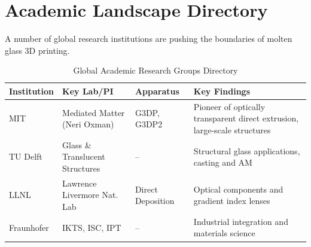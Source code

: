 \section{Academic Landscape Directory}
A number of global research institutions are pushing the boundaries of molten glass 3D printing.

\begin{table}[h]
\centering
\caption{Global Academic Research Groups Directory}
\begin{tabularx}{\textwidth}{l l l X}
\toprule
\textbf{Institution} & \textbf{Key Lab/PI} & \textbf{Apparatus} & \textbf{Key Findings} \\
\midrule
MIT & Mediated Matter (Neri Oxman) & G3DP, G3DP2 & Pioneer of optically transparent direct extrusion, large-scale structures \\
TU Delft & Glass \& Translucent Structures & -- & Structural glass applications, casting and AM \\
LLNL & Lawrence Livermore Nat. Lab & Direct Deposition & Optical components and gradient index lenses \\
Fraunhofer & IKTS, ISC, IPT & -- & Industrial integration and materials science \\
\bottomrule
\end{tabularx}
\end{table}
